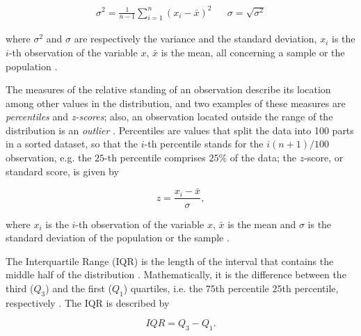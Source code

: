 \begin{align}
\label{eqn:variance_std}
\sigma^{2} = \frac{1}{n - 1} \sum_{i = 1}^{n} \left(x_{i} - \bar{x}\right)^{2}
&&
\sigma = \sqrt{\sigma^{2}}
\end{align}

\noindent where $\sigma^{2}$ and $\sigma$ are respectively the variance and the standard deviation, $x_{i}$ is the $i$-th observation of the variable $x$, $\bar{x}$ is the mean, all concerning a sample or the population \cite{zwillinger1999crc}.


The measures of the relative standing of an observation describe its location among other values in the distribution, and two examples of these measures are \emph{percentiles} and \emph{z-scores}; also, an observation located outside the range of the distribution is an \emph{outlier} \cite{mendenhall2016statistics}. Percentiles are values that split the data into 100 parts in a sorted dataset, so that the $i$-th percentile stands for the $i(n + 1) / 100$ observation, e.g. the $25$-th percentile comprises $25\%$ of the data; the $z$-score, or standard score, is given by

\begin{equation}
\label{eqn:z_score}
z = \frac{x_{i} - \bar{x}}{\sigma},
\end{equation}

\noindent where $x_{i}$ is the $i$-th observation of the variable $x$, $\bar{x}$ is the mean and $\sigma$ is the standard deviation of the population or the sample \cite{zwillinger1999crc}. 

The Interquartile Range (IQR) is the length of the interval that contains the middle half of the distribution \cite{degroot2012probability}. Mathematically, it is the difference between the third ($Q_{3}$) and the first ($Q_{1}$) quartiles, i.e. the $75$th percentile $25$th percentile, respectively \cite{devore2011probability}. The IQR is described by

\begin{equation}
\label{eqn:iqr}
IQR = Q_{3} - Q_{1}.
\end{equation}


